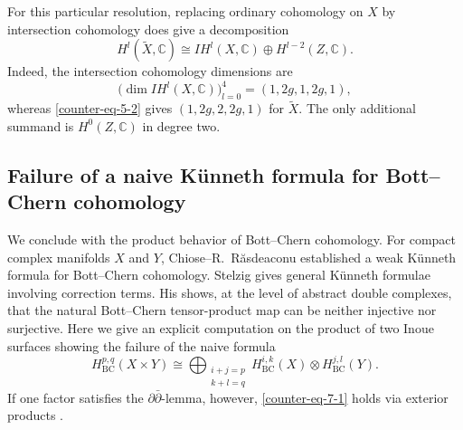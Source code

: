 \documentclass[11pt]{amsart}
\numberwithin{equation}{section}
\theoremstyle{plain}
\theoremstyle{definition}
\begin{document}
For this particular resolution, replacing ordinary cohomology on $X$ by
intersection cohomology does give a decomposition
\begin{equation*}%
H^l(\tilde{X},\mathbb C)
\cong IH^l(X,\mathbb C)\oplus H^{l-2}(Z,\mathbb C).
\end{equation*}
Indeed, the intersection cohomology dimensions are \cite[Example~2.2.2]{ACM}
\begin{equation*}%
\bigl(\dim IH^l(X,\mathbb C)\bigr)_{l=0}^4=(1,2g,1,2g,1),
\end{equation*}
whereas \eqref{counter-eq-5-2} gives $(1,2g,2,2g,1)$ for $\tilde{X}$.
The only additional summand is $H^0(Z,\mathbb C)$ in degree two.

\subsection{Failure of a naive K\"unneth formula for Bott--Chern cohomology}

We conclude with the product behavior of Bott--Chern cohomology.
For compact complex manifolds $X$ and $Y$, Chiose--R.~R\u{a}sdeaconu
\cite[Theorem~B]{CR} established a weak K\"unneth formula for Bott--Chern cohomology.
Stelzig \cite[Theorem 1.35 and Corollary 1.36]{Se25PH} gives general
K\"unneth formulae involving correction terms.  His
\cite[Example 1.34]{Se25PH} shows, at the level of abstract double
complexes, that the natural Bott--Chern tensor-product map can be neither
injective nor surjective.  Here we give an explicit computation on the
product of two Inoue surfaces showing the failure of the naive formula
  \begin{equation}\label{counter-eq-7-1}
H_{\mathrm{BC}}^{p,q}(X \times Y) \cong
\bigoplus_{\substack{i+j=p \\ k+l=q}}
H_{\mathrm{BC}}^{i,k}(X) \otimes H_{\mathrm{BC}}^{j,l}(Y).
\end{equation}
If one factor satisfies the $\partial\bar\partial$-lemma, however,
\eqref{counter-eq-7-1} holds via exterior products
\cite[Corollary 1.40]{Se25PH}.
\end{document}
